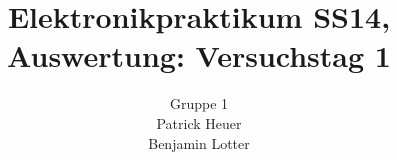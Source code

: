 \documentclass{beamer}
\title{Elektronikpraktikum SS14, Auswertung: Versuchstag 1}
\author{Gruppe 1 \\ Patrick Heuer \\ Benjamin Lotter}
\date{}
\begin{document}
\frame{\titlepage}








    
\end{document}
